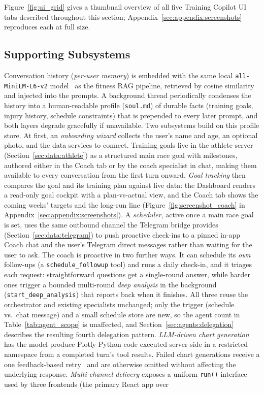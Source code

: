 Figure~\ref{fig:ui_grid} gives a thumbnail overview of all five Training Copilot UI tabs described throughout this section; Appendix~\ref{sec:appendix:screenshots} reproduces each at full size.



\subsection{Supporting Subsystems}\label{sec:architecture:supporting}

Conversation history (\textit{per-user memory}) is embedded with the same local \texttt{all-MiniLM-L6-v2} model~\citep{reimers_sentence-bert_2019} as the fitness RAG pipeline, retrieved by cosine similarity and injected into the prompts. A background thread periodically condenses the history into a human-readable profile (\texttt{soul.md}) of durable facts (training goals, injury history, schedule constraints) that is prepended to every later prompt, and both layers degrade gracefully if unavailable. Two subsystems build on this profile store. At first, an \textit{onboarding wizard} collects the user's name and age, an optional photo, and the data services to connect. Training goals live in the athlete server (Section~\ref{sec:data:athlete}) as a structured main race goal with milestones, authored either in the Coach tab or by the coach specialist in chat, making them available to every conversation from the first turn onward. \textit{Goal tracking} then compares the goal and its training plan against live data: the Dashboard renders a read-only goal cockpit with a plan-vs-actual view, and the Coach tab shows the coming weeks' targets and the long-run line (Figure~\ref{fig:screenshot_coach} in Appendix~\ref{sec:appendix:screenshots}). A \textit{scheduler}, active once a main race goal is set, uses the same outbound channel the Telegram bridge provides (Section~\ref{sec:data:telegram}) to push proactive check-ins to a pinned in-app Coach chat and the user's Telegram direct messages rather than waiting for the user to ask. The coach is proactive in two further ways. It can schedule its \textit{own} follow-ups (a \texttt{schedule\_followup} tool) and runs a daily check-in, and it triages each request: straightforward questions get a single-round answer, while harder ones trigger a bounded multi-round \textit{deep analysis} in the background (\texttt{start\_deep\_analysis}) that reports back when it finishes. All three reuse the orchestrator and existing specialists unchanged; only the trigger (schedule vs.\ chat message) and a small schedule store are new, so the agent count in Table~\ref{tab:agent_scope} is unaffected, and Section~\ref{sec:agents:delegation} describes the resulting fourth delegation pattern. \textit{LLM-driven chart generation} has the model produce Plotly Python code executed server-side in a restricted namespace from a completed turn's tool results. Failed chart generations receive a one feedback-based retry~\citep{shinn_reflexion_2023} and are otherwise omitted without affecting the underlying response. \textit{Multi-channel delivery} exposes a uniform \texttt{run()} interface used by three frontends (the primary React app over 